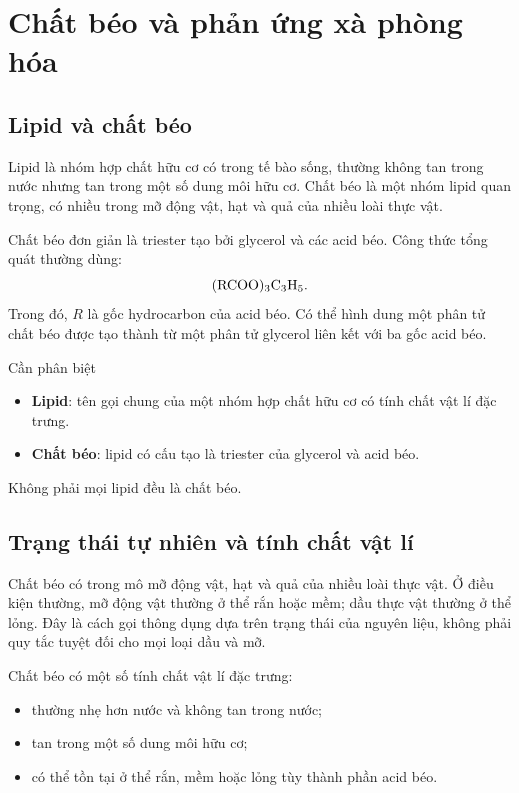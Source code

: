 \section{Chất béo và phản ứng xà phòng hóa}

\subsection{Lipid và chất béo}

Lipid là nhóm hợp chất hữu cơ có trong tế bào sống, thường không tan trong nước nhưng tan trong một số dung môi hữu cơ. Chất béo là một nhóm lipid quan trọng, có nhiều trong mỡ động vật, hạt và quả của nhiều loài thực vật.

Chất béo đơn giản là triester tạo bởi glycerol và các acid béo. Công thức tổng quát thường dùng:
\[
\ce{(RCOO)3C3H5}.
\]
Trong đó, $R$ là gốc hydrocarbon của acid béo. Có thể hình dung một phân tử chất béo được tạo thành từ một phân tử glycerol liên kết với ba gốc acid béo.

\begin{ghinho}{Cần phân biệt}
\begin{itemize}
\item \textbf{Lipid}: tên gọi chung của một nhóm hợp chất hữu cơ có tính chất vật lí đặc trưng.
\item \textbf{Chất béo}: lipid có cấu tạo là triester của glycerol và acid béo.
\end{itemize}
Không phải mọi lipid đều là chất béo.
\end{ghinho}

\subsection{Trạng thái tự nhiên và tính chất vật lí}

Chất béo có trong mô mỡ động vật, hạt và quả của nhiều loài thực vật. Ở điều kiện thường, mỡ động vật thường ở thể rắn hoặc mềm; dầu thực vật thường ở thể lỏng. Đây là cách gọi thông dụng dựa trên trạng thái của nguyên liệu, không phải quy tắc tuyệt đối cho mọi loại dầu và mỡ.

Chất béo có một số tính chất vật lí đặc trưng:
\begin{itemize}
\item thường nhẹ hơn nước và không tan trong nước;
\item tan trong một số dung môi hữu cơ;
\item có thể tồn tại ở thể rắn, mềm hoặc lỏng tùy thành phần acid béo.
\end{itemize}

